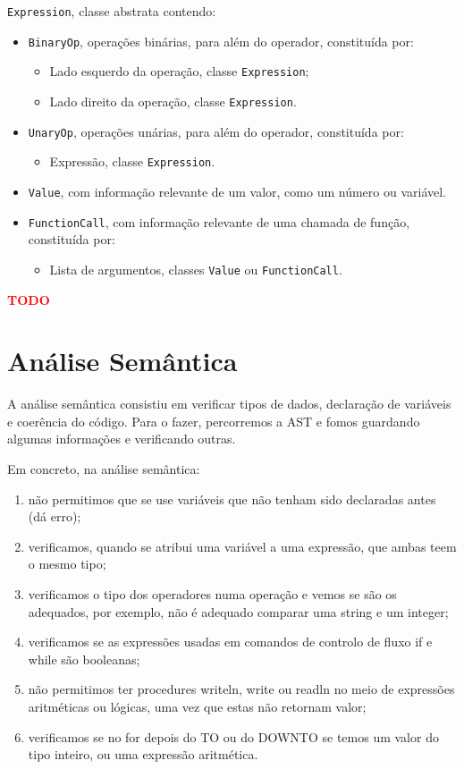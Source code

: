 \documentclass[12pt,a4paper]{report}
\begin{document}
\texttt{Expression}, classe abstrata contendo:
\begin{itemize}
    \item \texttt{BinaryOp}, operações binárias, para além do operador, constituída por:
    \begin{itemize}
        \item Lado esquerdo da operação, classe \texttt{Expression};
        \item Lado direito da operação, classe \texttt{Expression}.
    \end{itemize}
    \item \texttt{UnaryOp}, operações unárias, para além do operador, constituída por:
    \begin{itemize}
        \item Expressão, classe \texttt{Expression}.
    \end{itemize}
    \item \texttt{Value}, com informação relevante de um valor, como um número ou variável.
    \item \texttt{FunctionCall}, com informação relevante de uma chamada de função, constituída por:
    \begin{itemize}
        \item Lista de argumentos, classes \texttt{Value} ou \texttt{FunctionCall}.
    \end{itemize}
\end{itemize}

\textcolor{red}{\textbf{TODO}}

\chapter{Análise Semântica}

A análise semântica consistiu em verificar tipos de dados, declaração de variáveis e coerência do código. Para o fazer, percorremos a AST e fomos guardando algumas informações
e verificando outras.

Em concreto, na análise semântica:
\begin{enumerate}
    \item não permitimos que se use variáveis que não tenham sido declaradas antes (dá erro);
    \item verificamos, quando se atribui uma variável a uma expressão, que ambas teem o mesmo tipo;
    \item verificamos o tipo dos operadores numa operação e vemos se são os adequados, por exemplo, não é adequado comparar uma string e um integer;
    \item verificamos se as expressões usadas em comandos de controlo de fluxo if e while são booleanas;
    \item não permitimos ter procedures writeln, write ou readln no meio de expressões aritméticas ou lógicas, uma vez que estas não retornam valor;
    \item verificamos se no for depois do TO ou do DOWNTO se temos um valor do tipo inteiro, ou uma expressão aritmética.
\end{enumerate}
\end{document}
